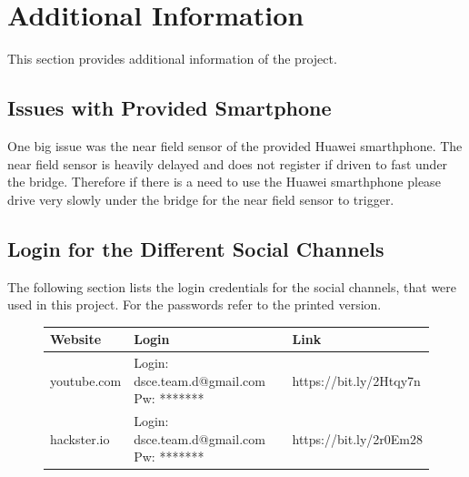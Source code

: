 \section{Additional Information}
This section provides additional information of the project. 

\subsection{Issues with Provided Smartphone}
One big issue was the near field sensor of the provided Huawei smarthphone. The near field sensor is heavily delayed and does not register if driven to fast under the bridge. Therefore if there is a need to use the Huawei smarthphone please drive very slowly under the bridge for the near field sensor to trigger. 

\subsection{Login for the Different Social Channels}
The following section lists the login credentials for the social channels, that were used in this project. For the passwords refer to the printed version.
\begin{figure}[H]
	\centering
	\begin{tabular}{ l | p{5.6cm} | p{5.6cm} }
		Website & Login & Link \\ \hline
		youtube.com & Login: dsce.team.d@gmail.com Pw: ******* & https://bit.ly/2Htqy7n\\
		hackster.io & Login: dsce.team.d@gmail.com Pw: ******* & https://bit.ly/2r0Em28 \\
	\end{tabular}
\end{figure}
\newpage
